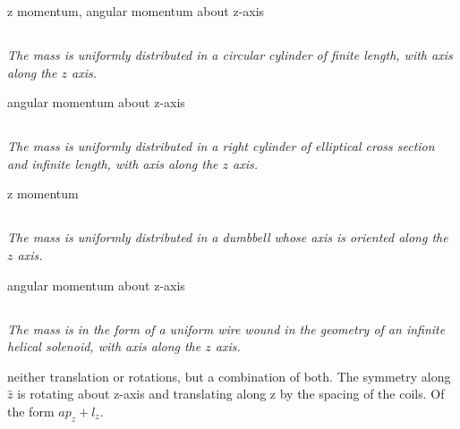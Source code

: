 \documentclass{article}
\begin{document}
z momentum, angular momentum about z-axis

\subsection{}
\textit{The mass is uniformly distributed in a circular cylinder of finite length, with axis along the $z$ axis.}

angular momentum about z-axis

\subsection{}
\textit{The mass is uniformly distributed in a right cylinder of elliptical cross section and infinite length, with axis along the $z$ axis.}

z momentum

\subsection{}
\textit{The mass is uniformly distributed in a dumbbell whose axis is oriented along the $z$ axis.}

angular momentum about z-axis

\subsection{}
\textit{The mass is in the form of a uniform wire wound in the geometry of an infinite helical solenoid, with axis along the $z$ axis.}

neither translation or rotations, but a combination of both. The symmetry along $\hat z$ is rotating about z-axis and translating along z by the spacing of the coils. Of the form $a p_z + l_z $.
\end{document}
